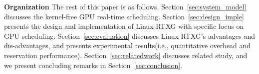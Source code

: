 \textbf{Organization}
The rest of this paper is as follows.
Section~\ref{sec:system_model} discusses the kernel-free GPU real-time scheduling.
Section~\ref{sec:design_imple} presents the design and implementation of Linux-RTXG with specific focus on GPU scheduling.
Section~\ref{sec:evaluation} discusses Linux-RTXG’s advantages and dis-advantages, and presents experimental results(i.e., quantitative overhead and reservation performance).
Section~\ref{sec:relatedwork} discusses related study, and we present concluding remarks in Section~\ref{sec:conclusion}.
